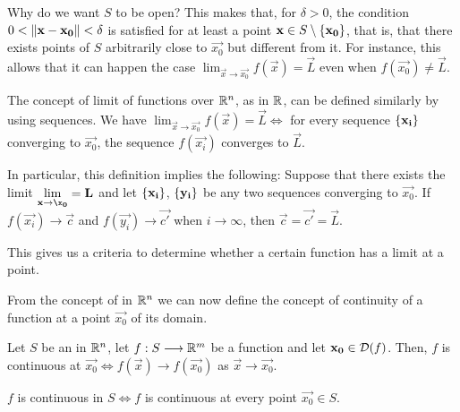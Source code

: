 \begin{note}
    Why do we want $S$ to be open? This makes that, for $\delta > 0$, the condition $0 < \left\Vert \mathbf{x} - \mathbf{x_0} \right\Vert < \delta$
    is satisfied for at least a point $\mathbf{x}\in S\setminus\{ \mathbf{x_0} \}$, that is, that there exists points of $S$
    arbitrarily close to $\vec{x_0}$ but different from it. For instance, this allows that it can happen the case 
    $\lim_{\vec{x}\to\vec{x_0}}f(\vec{x}) = \vec{L}$ even when $f(\vec{x_0})\neq \vec{L}$.
\end{note}

\begin{note}
The concept of limit of functions over $\Rtn$, as in $\R$, can be defined similarly by using sequences. We have 
$\lim_{\vec{x}\to\vec{x_0}} f(\vec{x}) = \vec{L}\iff$ for every sequence $\{ \mathbf{x_i} \}$ converging to $\vec{x_0}$, the
    sequence $f(\vec{x_i})$ converges to $\vec{L}$.

    In particular, this definition implies the following: Suppose that there exists the limit $\lim_{\vec{x}\to\vec{\x_0}}
    = \vec{L}$ and let $\{ \mathbf{x_i} \}$, $\{ \mathbf{y_i} \}$ be any two sequences converging to $\vec{x_0}$. If 
    $f(\vec{x_i})\longrightarrow\vec{c}$ and $f(\vec{y_i})\longrightarrow\vec{c'}$ when $i\longrightarrow\infty$, then
    $\vec{c} = \vec{c'} = \vec{L}$.

    This gives us a criteria to determine whether a certain function has a limit at a point. 
\end{note}

From the concept of  in $\Rtn$ we can now define the concept of continuity of a function
at a point $\vec{x_0}$ of its domain.

\begin{defn}
    Let $S$ be an  in $\Rtn$, let $\appl{f}{S}{\R^m}$ be a function and let $\vec{x_0}\in\dom{f}$. Then, 
    $f$ is continuous at $\vec{x_0}\iff f(\vec{x})\longrightarrow f(\vec{x_0})$ as $\vec{x}\longrightarrow\vec{x_0}$.
\end{defn}

\begin{remark}
    $f$ is continuous in $S\iff f$ is continuous at every point $\vec{x_0}\in S$.
\end{remark}

